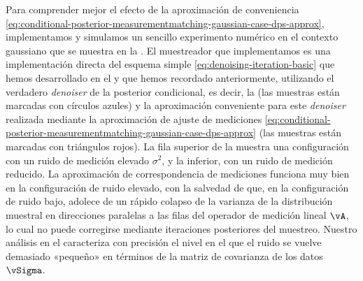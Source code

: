 \documentclass[../../book-main_es.tex]{subfiles}
\begin{document}
Para comprender mejor el efecto de la aproximación de conveniencia
\eqref{eq:conditional-posterior-measurementmatching-gaussian-case-dps-approx},
implementamos y simulamos un sencillo experimento numérico en el contexto gaussiano
que se muestra en la .
El muestreador que implementamos es una implementación directa del esquema simple
\eqref{eq:denoising-iteration-basic} que hemos desarrollado en el 
y que hemos recordado anteriormente, utilizando el verdadero \textit{denoiser} de la posterior condicional, es decir,
la  (las muestras están marcadas con
círculos azules) y la
aproximación conveniente para este \textit{denoiser} realizada mediante la aproximación de
ajuste de mediciones
\eqref{eq:conditional-posterior-measurementmatching-gaussian-case-dps-approx}
(las muestras están marcadas con triángulos rojos).
La fila superior de la  muestra
una configuración con un ruido de medición elevado $\sigma^2$, y la inferior, con un
ruido de medición reducido.
La aproximación de correspondencia de mediciones funciona muy bien en la configuración de ruido elevado,
con la salvedad de que, en la configuración de ruido bajo, adolece de
un rápido colapso de la varianza de la distribución muestral en direcciones
paralelas a las filas del operador de medición lineal $\vA$, lo cual
no puede corregirse mediante iteraciones posteriores del muestreo.
Nuestro análisis en el  caracteriza con precisión
el nivel en el que el ruido se vuelve demasiado «pequeño» en términos de la
matriz de covarianza de los datos $\vSigma$.
\end{document}

